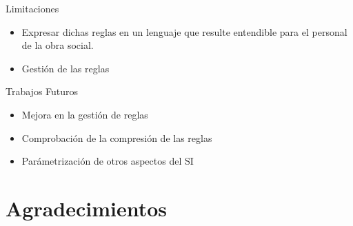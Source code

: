 \documentclass[10pt]{beamer}
\begin{document}
\begin{frame}{Limitaciones}
    \begin{itemize}
        \item Expresar dichas reglas en un lenguaje que resulte entendible para el personal de la obra social.
        \item Gestión de las reglas
    \end{itemize}
\end{frame}

\begin{frame}{Trabajos Futuros}
    \begin{itemize}
        \item Mejora en la gestión de reglas
        \item Comprobación de la compresión de las reglas
        \item Parámetrización de otros aspectos del SI
    \end{itemize}
\end{frame}

\section{Agradecimientos}
\end{document}
